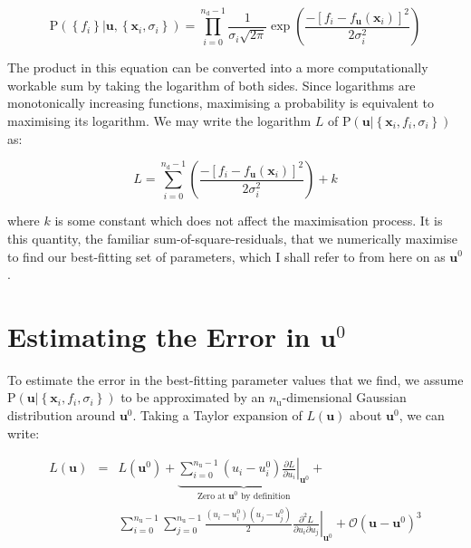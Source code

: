 \documentclass[a4paper,onecolumn,11pt]{book}
\begin{document}
\begin{equation}
\mathrm{P}\left( \left\{f_i \right\} | \mathbf{u}, \left\{ \mathbf{x}_i, \sigma_i \right\} \right)
=
\prod_{i=0}^{n_\mathrm{d}-1} \frac{1}{\sigma_i\sqrt{2\pi}} \exp \left(
\frac{
-\left[f_i - f_\mathbf{u}(\mathbf{x}_i)\right]^2
}{
2 \sigma_i^2
} \right)
\end{equation}

The product in this equation can be converted into a more computationally
workable sum by taking the logarithm of both sides. Since logarithms are
monotonically increasing functions, maximising a probability is equivalent to
maximising its logarithm. We may write the logarithm $L$ of $\mathrm{P}\left(
\mathbf{u} | \left\{ \mathbf{x}_i, f_i, \sigma_i \right\} \right)$ as:

\begin{equation}
L = \sum_{i=0}^{n_\mathrm{d}-1}
\left( \frac{
-\left[f_i - f_\mathbf{u}(\mathbf{x}_i)\right]^2
}{
2 \sigma_i^2
} \right) + k
\end{equation}

\noindent where $k$ is some constant which does not affect the maximisation
process. It is this quantity, the familiar sum-of-square-residuals, that we
numerically maximise to find our best-fitting set of parameters, which I shall
refer to from here on as $\mathbf{u}^0$.

\section{Estimating the Error in $\mathbf{u}^0$}

To estimate the error in the best-fitting parameter values that we find, we
assume $\mathrm{P}\left( \mathbf{u} | \left\{ \mathbf{x}_i, f_i, \sigma_i
\right\} \right)$ to be approximated by an $n_\mathrm{u}$-dimensional Gaussian
distribution around $\mathbf{u}^0$. Taking a Taylor expansion of
$L(\mathbf{u})$ about $\mathbf{u}^0$, we can write:

\begin{eqnarray}
L(\mathbf{u}) & = & L(\mathbf{u}^0) +
    \underbrace{
      \sum_{i=0}^{n_\mathrm{u}-1} \left( u_i - u^0_i \right)
      \left.\frac{\partial L}{\partial u_i}\right|_{\mathbf{u}^0}
    }_{\textrm{Zero at $\mathbf{u}^0$ by definition}} + \label{L_taylor_expand}\\
& & \sum_{i=0}^{n_\mathrm{u}-1} \sum_{j=0}^{n_\mathrm{u}-1} \frac{\left( u_i - u^0_i \right) \left( u_j - u^0_j \right)}{2}
    \left.\frac{\partial^2 L}{\partial u_i \partial u_j}\right|_{\mathbf{u}^0} +
    \mathcal{O}\left( \mathbf{u} - \mathbf{u}^0\right)^3 \nonumber
\end{eqnarray}
\end{document}
